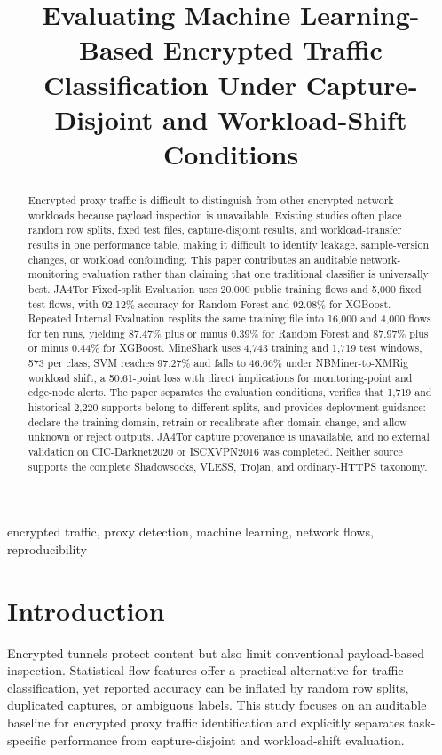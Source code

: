 \documentclass[conference]{IEEEtran}
\title{Evaluating Machine Learning-Based Encrypted Traffic Classification Under Capture-Disjoint and Workload-Shift Conditions}
\author{\IEEEauthorblockN{ZhangXiaoyuan (张校源)}\IEEEauthorblockA{Independent Researcher\\Email: silenceyuan2018@gmail.com\\ORCID: 0009-0006-6147-9256}}
\begin{document}
\sloppy
\maketitle
\begin{abstract}
Encrypted proxy traffic is difficult to distinguish from other encrypted network workloads because payload inspection is unavailable. Existing studies often place random row splits, fixed test files, capture-disjoint results, and workload-transfer results in one performance table, making it difficult to identify leakage, sample-version changes, or workload confounding. This paper contributes an auditable network-monitoring evaluation rather than claiming that one traditional classifier is universally best. JA4Tor Fixed-split Evaluation uses 20,000 public training flows and 5,000 fixed test flows, with 92.12\% accuracy for Random Forest and 92.08\% for XGBoost. Repeated Internal Evaluation resplits the same training file into 16,000 and 4,000 flows for ten runs, yielding 87.47\% plus or minus 0.39\% for Random Forest and 87.97\% plus or minus 0.44\% for XGBoost. MineShark uses 4,743 training and 1,719 test windows, 573 per class; SVM reaches 97.27\% and falls to 46.66\% under NBMiner-to-XMRig workload shift, a 50.61-point loss with direct implications for monitoring-point and edge-node alerts. The paper separates the evaluation conditions, verifies that 1,719 and historical 2,220 supports belong to different splits, and provides deployment guidance: declare the training domain, retrain or recalibrate after domain change, and allow unknown or reject outputs. JA4Tor capture provenance is unavailable, and no external validation on CIC-Darknet2020 or ISCXVPN2016 was completed. Neither source supports the complete Shadowsocks, VLESS, Trojan, and ordinary-HTTPS taxonomy.
\end{abstract}
\begin{IEEEkeywords}
encrypted traffic, proxy detection, machine learning, network flows, reproducibility
\end{IEEEkeywords}

\section{Introduction}
Encrypted tunnels protect content but also limit conventional payload-based inspection. Statistical flow features offer a practical alternative for traffic classification, yet reported accuracy can be inflated by random row splits, duplicated captures, or ambiguous labels. This study focuses on an auditable baseline for encrypted proxy traffic identification and explicitly separates task-specific performance from capture-disjoint and workload-shift evaluation.
\end{document}
